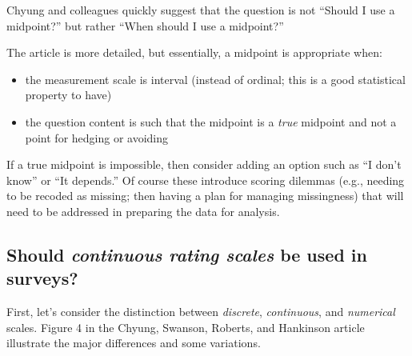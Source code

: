 \documentclass[
  english,
]{book}
\providecommand{\tightlist}{%
  \setlength{\itemsep}{0pt}\setlength{\parskip}{0pt}}
\begin{document}
Chyung and colleagues quickly suggest that the question is not ``Should I use a midpoint?'' but rather ``When should I use a midpoint?''

The article is more detailed, but essentially, a midpoint is appropriate when:

\begin{itemize}
\tightlist
\item
  the measurement scale is interval (instead of ordinal; this is a good statistical property to have)
\item
  the question content is such that the midpoint is a \emph{true} midpoint and not a point for hedging or avoiding
\end{itemize}

If a true midpoint is impossible, then consider adding an option such as ``I don't know'' or ``It depends.'' Of course these introduce scoring dilemmas (e.g., needing to be recoded as missing; then having a plan for managing missingness) that will need to be addressed in preparing the data for analysis.

\hypertarget{should-continuous-rating-scales-be-used-in-surveys}{%
\subsection{\texorpdfstring{Should \emph{continuous rating scales} be used in surveys?}{Should continuous rating scales be used in surveys?}}\label{should-continuous-rating-scales-be-used-in-surveys}}

First, let's consider the distinction between \emph{discrete}, \emph{continuous}, and \emph{numerical} scales. Figure 4 in the Chyung, Swanson, Roberts, and Hankinson \citeyearpar{chyung_evidencebased_2018-1} article illustrate the major differences and some variations.
\end{document}
